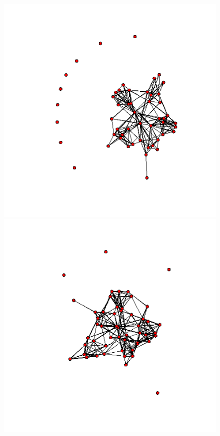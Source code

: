 \documentclass[a4paper, 11pt]{report}
\theoremstyle{definition}
\begin{document}
\begin{figure}[h]
    \begin{center}
    \includegraphics[scale=0.26]{pictures/m1_19_nework.png}
    \includegraphics[scale=0.26]{pictures/w1_19_nework.png}

\end{center}
\end{figure}
\end{document}
